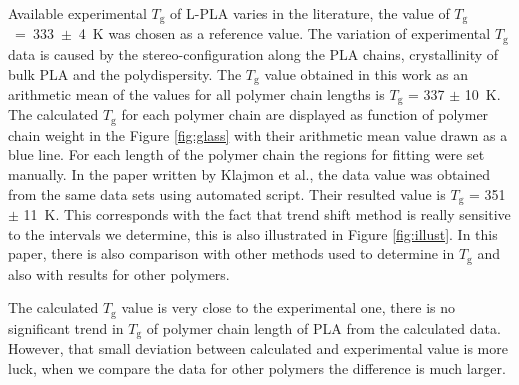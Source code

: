 Available experimental $T_\mathrm{g}$ of L-PLA varies in the literature, the value  of $T_\mathrm{g}$~=~333~$\pm$~4~K \cite{pyda_reversing_2005} was chosen as a reference value. The variation of experimental $T_\mathrm{g}$ data is caused by the stereo-configuration along the PLA chains, crystallinity of bulk PLA and the polydispersity. \cite{klajmon_glass_2023} The $T_\mathrm{g}$ value obtained in this work as an arithmetic mean of the values for all polymer chain lengths  is $T_\mathrm{g}$ = 337 $\pm$ 10~K. The calculated $T_\mathrm{g}$ for each polymer chain are displayed as function of polymer chain weight in the Figure \ref{fig:glass} with their arithmetic mean value drawn as a blue line. For each length of the polymer chain the regions for fitting were set manually. 
\newpage
In the paper written by Klajmon et al.\cite{klajmon_glass_2023}, the data value was obtained from the same data sets using automated script. Their resulted value is $T_\mathrm{g}$ = 351 $\pm$ 11~K. This corresponds with the fact that trend shift method is really sensitive to the intervals we determine, this is also illustrated in Figure \ref{fig:illust}. In this paper, there is also comparison with other methods used to determine in $T_\mathrm{g}$ and also with results for other polymers. 

The calculated $T_\mathrm{g}$ value is very close to the experimental one, there is no significant trend in $T_\mathrm{g}$ of polymer chain length of PLA from the calculated data. However, that small deviation between calculated and experimental value is more luck, when we compare the data for other polymers the difference is much larger.


